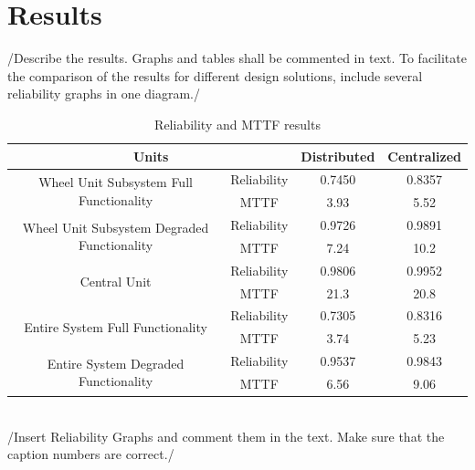 \newpage
\section{Results}
\label{S4}


/{Describe the results. Graphs and tables shall be commented in text. To facilitate the comparison of the results for different design solutions, include several reliability graphs in one diagram.}/
\begin{table}[h]
\centering
\begin{tabular}{| c | c | c | c |}
\hline
\multicolumn{2}{|c|}{Units} & Distributed & Centralized\\
\hline
\multirow{2}{*}{Wheel Unit Subsystem Full Functionality} & Reliability & 0.7450 & 0.8357\\
 & MTTF & 3.93  & 5.52\\
\hline
\multirow{2}{*}{Wheel Unit Subsystem Degraded Functionality}& Reliability & 0.9726  & 0.9891\\
 & MTTF & 7.24 & 10.2\\
\hline
\multirow{2}{*}{Central Unit}& Reliability& 0.9806  & 0.9952\\
 & MTTF & 21.3  & 20.8\\
\hline
\multirow{2}{*}{Entire System Full Functionality}& Reliability & 0.7305  & 0.8316\\
 & MTTF & 3.74 & 5.23\\
\hline
\multirow{2}{*}{Entire System Degraded Functionality}& Reliability & 0.9537 & 0.9843\\
 & MTTF & 6.56 & 9.06\\
\hline
\end{tabular}
\caption{Reliability and MTTF results}
\label{tab:Put a Lable}
\end{table}
\\/{Insert Reliability Graphs and comment them in the text. Make sure that the caption numbers are correct.}/

